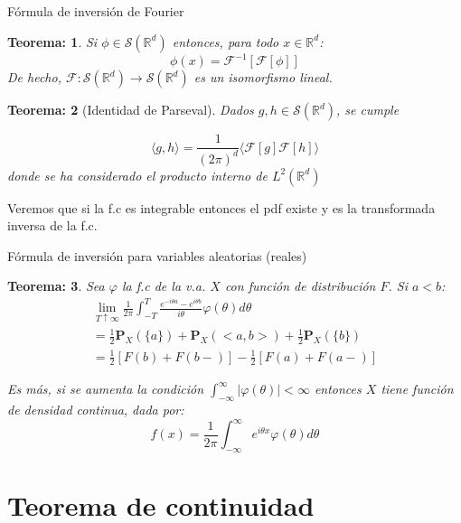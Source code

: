 \documentclass{beamer}
\newcommand{\ds}{\displaystyle}
\newcommand{\R}{\mathbb{R}}
\newcommand{\Rd}{\R^{d}}
\newcommand{\Sr}{\mathcal{S}(\mathbb{R}^{d})}
\newcommand{\vp}{\varphi}
\newcommand{\F}{\mathcal{F}}
\newcommand{\pro}{\mathbf{P}}
\newtheorem{teo}{Teorema:}
\begin{document}
\begin{frame}{Fórmula de inversión de Fourier}
	\begin{teo}
		Si $\phi \in \Sr$ entonces, para todo $x\in \Rd$: $$ \phi (x) = \F^{-1}[ \F[\phi]  ] $$
		De hecho, $\F:\Sr  \rightarrow \Sr $ es un isomorfismo lineal.
	\end{teo}

\begin{teo} [Identidad de Parseval]
	Dados $ g, h  \in \Sr $, se cumple 

	$$\langle g,h  \rangle =  \frac{1}{(2 \pi)^{d}} \langle \F[g] \F[h] \rangle $$
	donde se ha considerado el producto interno de $L^{2}(\R^{d})$
\end{teo}


Veremos que si la f.c es integrable entonces el pdf existe y es la transformada inversa de la f.c.

\end{frame}



\begin{frame}{Fórmula de inversión para variables aleatorias (reales)}
	\begin{teo}\label{caract}
		Sea $\vp$ la f.c de la v.a. $X$ con función de distribución $F$. Si $a< b$: 
		$$\begin{array}{l}
		\lim\limits_{T\uparrow \infty} \ds \frac{1}{2\pi} \ds \int_{-T}^{T} \frac{e^{-i \theta a} - e^{i\theta b}}{i\theta} \vp(\theta) d\theta  \\
		=  \ds \frac{1}{2} \pro_{X} (\{a\}) + \pro_{X} (<a,b>) + \frac{1}{2}\pro_{X}(\{b\}) \\
		= \ds \frac{1}{2} [ F(b) + F(b-) ] - \frac{1}{2}[F(a)+F(a-)]
		\end{array}$$
		
		Es más, si se aumenta la condición $ \ds \int_{-\infty}^{\infty} | \vp (\theta) | < \infty $ entonces $X$ tiene función de densidad continua, dada por:
		$$ f(x)= \frac{1}{2\pi} \int_{-\infty}^{\infty} e^{i\theta x} \vp (\theta) d \theta  $$
	\end{teo}


\end{frame}



\section{Teorema de continuidad}
\end{document}
